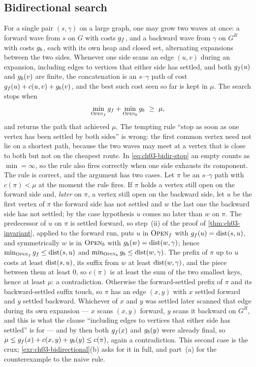 \subsection{Bidirectional search}
\label{sec:ch03-bidirectional}
%
For a single pair $(s,\gamma)$ on a large graph, one may grow two waves at once: a forward wave from
$s$ on $G$ with costs $g_f$, and a backward wave from $\gamma$ on $G^{R}$ with costs $g_b$,
each with its own heap and closed set, alternating expansions between the two sides. Whenever one side scans an edge
$(u,v)$ during an expansion, including edges to vertices that either side has settled, and both
$g_f(u)$ and $g_b(v)$ are finite, the concatenation is an $s$--$\gamma$ path of cost
$g_f(u)+c(u,v)+g_b(v)$, and the best such cost seen so far is kept in $\mu$. The
search stops when
\begin{equation}
\label{eq:ch03-bidir-stop}
\min_{\text{\textsc{Open}}_f}g_f+\min_{\text{\textsc{Open}}_b}g_b\ \ge\ \mu ,
\end{equation}
and returns the path that achieved $\mu$. The tempting rule ``stop as soon as one vertex has
been settled by both sides'' is wrong: the first common vertex need not lie on a shortest path,
because the two waves may meet at a vertex that is close to both but not on the cheapest route.
In \cref{eq:ch03-bidir-stop} an empty \Open counts as $\min=\infty$, so the rule also fires
correctly when one side exhausts its component. The rule is correct, and the argument has two
cases. Let $\pi$ be an $s$--$\gamma$ path with $c(\pi)<\mu$ at the moment the rule fires. If $\pi$
holds a vertex still open on the forward side and, \emph{later} on $\pi$, a vertex still open on
the backward side, let $u$ be the first vertex of $\pi$ the forward side has not settled and $w$
the last one the backward side has not settled; by the case hypothesis $u$ comes no later than
$w$ on $\pi$. The predecessor of $u$ on $\pi$ is settled forward, so step~(ii) of the proof of
\cref{thm:ch03-invariant}, applied to the forward run, puts $u$ in $\text{\textsc{Open}}_f$ with
$g_f(u)=\operatorname{dist}(s,u)$, and symmetrically $w$ is in $\text{\textsc{Open}}_b$ with
$g_b(w)=\operatorname{dist}(w,\gamma)$; hence $\min_{\text{\textsc{Open}}_f}g_f\le\operatorname{dist}(s,u)$ and
$\min_{\text{\textsc{Open}}_b}g_b\le\operatorname{dist}(w,\gamma)$. The prefix of $\pi$ up to $u$ costs at least
$\operatorname{dist}(s,u)$, its suffix from $w$ at least $\operatorname{dist}(w,\gamma)$, and the piece between them at least
$0$, so $c(\pi)$ is at least the sum of the two smallest keys, hence at least $\mu$: a
contradiction. Otherwise the forward-settled prefix of $\pi$ and its backward-settled
suffix touch, so $\pi$ has an edge $(x,y)$ with $x$ settled forward and $y$ settled backward.
Whichever of $x$ and $y$ was settled later scanned that edge during its own expansion --- $x$
scans $(x,y)$ forward, $y$ scans it backward on $G^{R}$, and this is what the clause ``including
edges to vertices that either side has settled'' is for --- and by then both $g_f(x)$ and
$g_b(y)$ were already final, so $\mu\le g_f(x)+c(x,y)+g_b(y)\le c(\pi)$, again a contradiction. This
second case is the crux; \cref{exr:ch03-bidirectional}(b) asks for it in full, and part~(a) for
the counterexample to the naive rule.

